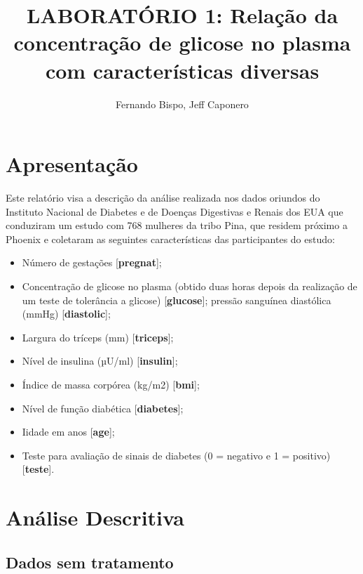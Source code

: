 \documentclass[
  twocolumn,
  landscape]{report}
\title{LABORATÓRIO 1: Relação da concentração de glicose no plasma com
características diversas}
\author{Fernando Bispo, Jeff Caponero}
\date{}
\providecommand{\tightlist}{%
  \setlength{\itemsep}{0pt}\setlength{\parskip}{0pt}}\usepackage{longtable,booktabs,array}
\begin{document}
\maketitle
\ifdefined\Shaded\renewenvironment{Shaded}{\begin{tcolorbox}[boxrule=0pt, frame hidden, interior hidden, enhanced, borderline west={3pt}{0pt}{shadecolor}, breakable, sharp corners]}{\end{tcolorbox}}\fi

\listoffigures
\listoftables
\hypertarget{apresentauxe7uxe3o}{%
\section{Apresentação}\label{apresentauxe7uxe3o}}

Este relatório visa a descrição da análise realizada nos dados oriundos
do Instituto Nacional de Diabetes e de Doenças Digestivas e Renais dos
EUA que conduziram um estudo com 768 mulheres da tribo Pina, que residem
próximo a Phoenix e coletaram as seguintes características das
participantes do estudo:

\begin{itemize}
\tightlist
\item
  Número de gestações {[}\textbf{pregnat}{]};
\item
  Concentração de glicose no plasma (obtido duas horas depois da
  realização de um teste de tolerância a glicose)
  {[}\textbf{glucose}{]}; pressão sanguínea diastólica (mmHg)
  {[}\textbf{diastolic}{]};
\item
  Largura do tríceps (mm) {[}\textbf{triceps}{]};
\item
  Nível de insulina (µU/ml) {[}\textbf{insulin}{]};
\item
  Índice de massa corpórea (kg/m2) {[}\textbf{bmi}{]};
\item
  Nível de função diabética {[}\textbf{diabetes}{]};
\item
  Iidade em anos {[}\textbf{age}{]};
\item
  Teste para avaliação de sinais de diabetes (0 = negativo e 1 =
  positivo) {[}\textbf{teste}{]}.
\end{itemize}

\hypertarget{anuxe1lise-descritiva}{%
\section{Análise Descritiva}\label{anuxe1lise-descritiva}}

\subsection{Dados sem tratamento}
\end{document}
